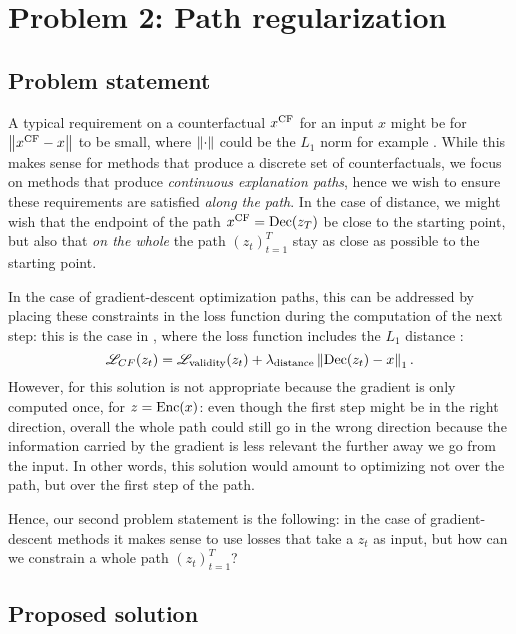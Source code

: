\documentclass[../main.tex]{subfiles}
\begin{document}
\section{Problem 2: Path regularization}

\subsection{Problem statement}

A typical requirement on a counterfactual $x^\text{CF}$ for an input $x$ might be for $\left\lVert x^\text{CF} - x\right\rVert$ to be small, where $\left\lVert\cdot\right\rVert$ could be the $L_1$ norm for example .
While this makes sense for methods that produce a discrete set of counterfactuals, we focus on methods that produce \emph{continuous explanation paths}, hence we wish to ensure these requirements are satisfied \emph{along the path}.
In the case of distance, we might wish that the endpoint of the path $x^\text{CF} = \operatorname{Dec}(z_T)$ be close to the starting point, but also that \emph{on the whole} the path $(z_t)_{t=1}^T$ stay as close as possible to the starting point.

In the case of gradient-descent optimization paths, this can be addressed by placing these constraints in the loss function during the computation of the next step: this is the case in \revise{}, where the loss function includes the $L_1$ distance \cite{joshiRealistic2019}:
\begin{equation*}
    \mathscr{L}_{CF}(z_t) = \mathscr{L}_\text{validity}(z_t) + \lambda_\text{distance} \left\lVert\operatorname{Dec}(z_t) - x\right\rVert_1.
\end{equation*}
However, for \ls{} this solution is not appropriate because the gradient is only computed once, for $z = \operatorname{Enc}(x)$: even though the first step might be in the right direction, overall the whole path could still go in the wrong direction because the information carried by the gradient is less relevant the further away we go from the input.
In other words, this solution would amount to optimizing not over the path, but over the first step of the path.

Hence, our second problem statement is the following: in the case of gradient-descent methods it makes sense to use losses that take a $z_t$ as input, but how can we constrain a whole path $(z_t)_{t=1}^T$?

\subsection{Proposed solution}
\end{document}
